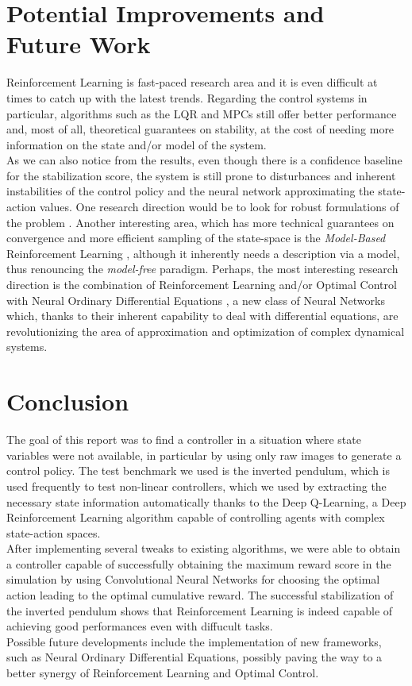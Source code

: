 \documentclass[11pt]{article}
\begin{document}
\section{Potential Improvements and Future Work}
Reinforcement Learning is fast-paced research area and it is even difficult at times to catch up with the latest trends. Regarding the control systems in particular, algorithms such as the LQR and MPCs still offer better performance and, most of all, theoretical guarantees on stability, at the cost of needing more information on the state and/or model of the system. \\
As we can also notice from the results, even though there is a confidence baseline for the stabilization score, the system is still prone to disturbances and inherent instabilities of the control policy and the neural network approximating the state-action values. One research direction would be to look for robust formulations of the problem \cite{DBLP:journals/corr/PintoDSG17}. Another interesting area, which has more technical guarantees on convergence and more efficient sampling of the state-space is the \textit{Model-Based} Reinforcement Learning \cite{DBLP:journals/corr/abs-1903-00374}, although it inherently needs a description via a model, thus renouncing the \textit{model-free} paradigm. Perhaps, the most interesting research direction is the combination of Reinforcement Learning and/or Optimal Control with Neural Ordinary Differential Equations \cite{NEURIPS2018_69386f6b}, a new class of Neural Networks which, thanks to their inherent capability to deal with differential equations, are revolutionizing the area of approximation and optimization of complex dynamical systems.

\section{Conclusion}
The goal of this report was to find a controller in a situation where state variables were not available, in particular by using only raw images to generate a control policy.
The test benchmark we used is the inverted pendulum, which is used frequently to test non-linear controllers, which we used by extracting the necessary state information automatically thanks to the Deep Q-Learning, a Deep Reinforcement Learning algorithm capable of controlling agents with complex state-action spaces.\\
After implementing several tweaks to existing algorithms, we were able to obtain a controller capable of successfully obtaining the maximum reward score in the simulation by using Convolutional Neural Networks for choosing the optimal action leading to the optimal cumulative reward. The successful stabilization of the inverted pendulum shows that Reinforcement Learning is indeed capable of achieving good performances even with diffucult tasks.\\
Possible future developments include the implementation of new frameworks, such as Neural Ordinary Differential Equations, possibly paving the way to a better synergy of Reinforcement Learning and Optimal Control.
\printbibliography
\end{document}

